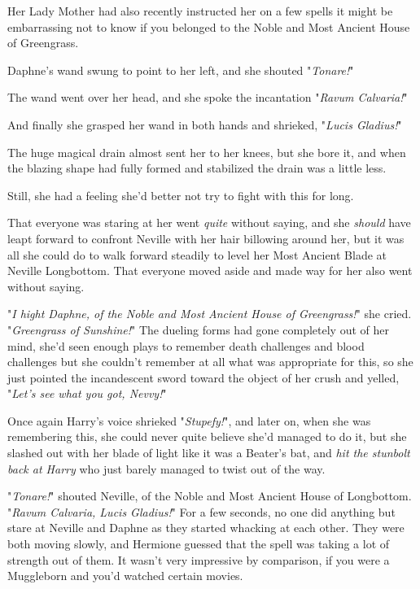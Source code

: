 Her Lady Mother had also recently instructed her on a few spells it might be
embarrassing not to know if you belonged to the Noble and Most Ancient House of
Greengrass.

Daphne's wand swung to point to her left, and she shouted "\emph{Tonare!}"

The wand went over her head, and she spoke the incantation "\emph{Ravum
Calvaria!}"

And finally she grasped her wand in both hands and shrieked, "\emph{Lucis
Gladius!}"

The huge magical drain almost sent her to her knees, but she bore it, and when
the blazing shape had fully formed and stabilized the drain was a little less.

Still, she had a feeling she'd better not try to fight with this for long.

That everyone was staring at her went \emph{quite} without saying, and she
\emph{should} have leapt forward to confront Neville with her hair billowing
around her, but it was all she could do to walk forward steadily to level her
Most Ancient Blade at Neville Longbottom. That everyone moved aside and made
way for her also went without saying.

"\emph{I hight Daphne, of the Noble and Most Ancient House of Greengrass!}" she
cried. "\emph{Greengrass of Sunshine!}" The dueling forms had gone completely
out of her mind, she'd seen enough plays to remember death challenges and blood
challenges but she couldn't remember at all what was appropriate for this, so
she just pointed the incandescent sword toward the object of her crush and
yelled, "\emph{Let's see what you got, Nevvy!}"

Once again Harry's voice shrieked "\emph{Stupefy!}", and later on, when she was
remembering this, she could never quite believe she'd managed to do it, but she
slashed out with her blade of light like it was a Beater's bat, and \emph{hit
the stunbolt back at Harry} who just barely managed to twist out of the way.

"\emph{Tonare!}" shouted Neville, of the Noble and Most Ancient House of
Longbottom. "\emph{Ravum Calvaria, Lucis Gladius!}"
\sbreak
For a few seconds, no one did anything but stare at Neville and Daphne as they
started whacking at each other. They were both moving slowly, and Hermione
guessed that the spell was taking a lot of strength out of them. It wasn't very
impressive by comparison, if you were a Muggleborn and you'd watched certain
movies.

